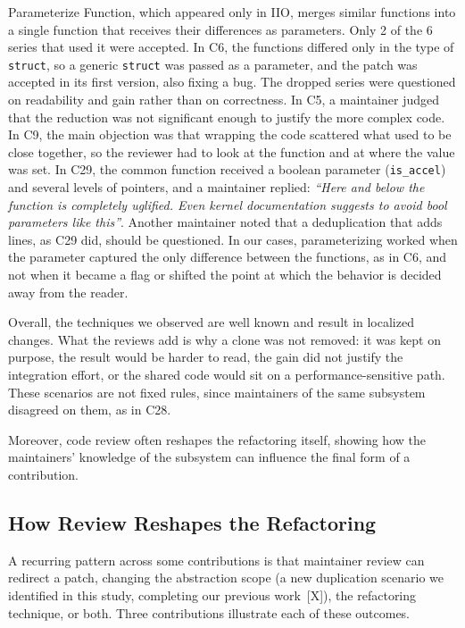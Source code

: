 \documentclass[10pt,conference]{IEEEtran}
\begin{document}
Parameterize Function, which appeared only in IIO, merges similar functions into a single function that receives their differences as parameters. Only 2 of the 6 series that used it were accepted. In C6, the functions differed only in the type of \texttt{struct}, so a generic \texttt{struct} was passed as a parameter, and the patch was accepted in its first version, also fixing a bug. The dropped series were questioned on readability and gain rather than on correctness. In C5, a maintainer judged that the reduction was not significant enough to justify the more complex code. In C9, the main objection was that wrapping the code scattered what used to be close together, so the reviewer had to look at the function and at where the value was set. In C29, the common function received a boolean parameter (\texttt{is\_accel}) and several levels of pointers, and a maintainer replied: \textit{``Here and below the function is completely uglified. Even kernel documentation suggests to avoid bool parameters like this''}. Another maintainer noted that a deduplication that adds lines, as C29 did, should be questioned. In our cases, parameterizing worked when the parameter captured the only difference between the functions, as in C6, and not when it became a flag or shifted the point at which the behavior is decided away from the reader.

Overall, the techniques we observed are well known and result in localized changes. What the reviews add is why a clone was not removed: it was kept on purpose, the result would be harder to read, the gain did not justify the integration effort, or the shared code would sit on a performance-sensitive path. These scenarios are not fixed rules, since maintainers of the same subsystem disagreed on them, as in C28.

Moreover, code review often reshapes the refactoring itself, showing how the maintainers' knowledge of the subsystem can influence the final form of a contribution.

\subsection{How Review Reshapes the Refactoring}\label{subsec:how-review-reshapes-the-refactoring}
A recurring pattern across some contributions is that maintainer review can redirect a patch, changing the abstraction scope (a new duplication scenario we identified in this study, completing our previous work~[X]), the refactoring technique, or both. Three contributions illustrate each of these outcomes.
\end{document}
